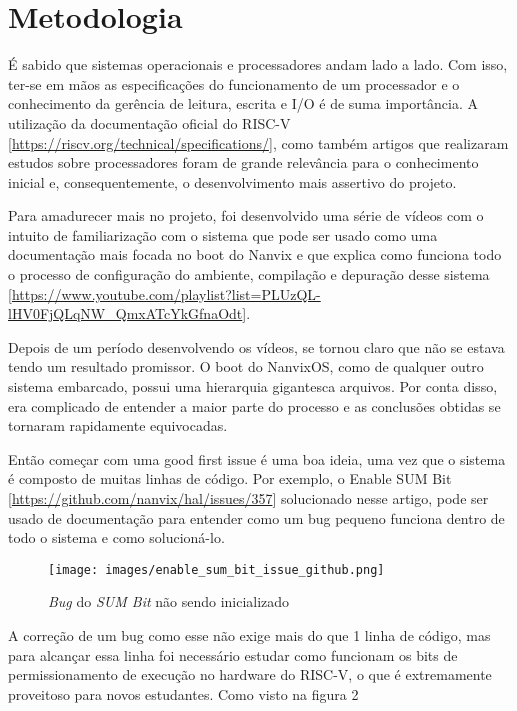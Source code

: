 \section{Metodologia}

É sabido que sistemas operacionais e processadores andam lado a lado. Com isso, ter-se em mãos as especificações do funcionamento de um processador e o conhecimento da gerência de leitura, escrita e I/O é de suma importância. A utilização da documentação oficial do RISC-V [\url{https://riscv.org/technical/specifications/}], como também artigos que realizaram estudos sobre processadores foram de grande relevância para o conhecimento inicial e, consequentemente, o desenvolvimento mais assertivo do projeto. 

Para amadurecer mais no projeto, foi desenvolvido uma série de vídeos com o intuito de familiarização com o sistema que pode ser usado como uma documentação mais focada no boot do Nanvix e que explica como funciona todo o processo de configuração do ambiente, compilação e depuração desse sistema [\url{https://www.youtube.com/playlist?list=PLUzQL-lHV0FjQLqNW_QmxATcYkGfnaOdt}]. 

Depois de um período desenvolvendo os vídeos, se tornou claro que não se estava tendo um resultado promissor. O boot do NanvixOS, como de qualquer outro sistema embarcado, possui uma hierarquia gigantesca arquivos. Por conta disso, era complicado de entender a maior parte do processo e as conclusões obtidas se tornaram rapidamente equivocadas.  

Então começar com uma good first issue é uma boa ideia, uma vez que o sistema é composto de muitas linhas de código. Por exemplo, o Enable SUM Bit [\url{https://github.com/nanvix/hal/issues/357}] solucionado nesse artigo, pode ser usado de documentação para entender como um bug pequeno funciona dentro de todo o sistema e como solucioná-lo.  

\begin{figure}[h!]
    \centering
    \texttt{[image: images/enable\_sum\_bit\_issue\_github.png]}
    \caption{\emph{Bug} do \emph{SUM Bit} não sendo inicializado}
\end{figure}

A correção de um bug como esse não exige mais do que 1 linha de código, mas para alcançar essa linha foi necessário estudar como funcionam os bits de permissionamento de execução no hardware do RISC-V, o que é extremamente proveitoso para novos estudantes. Como visto na figura 2

